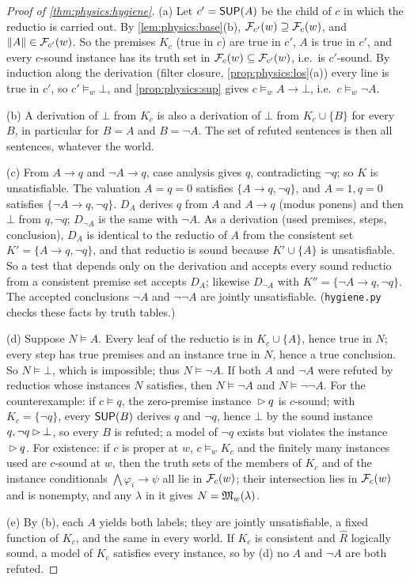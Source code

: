 \begin{proof}[Proof of \cref{thm:physics:hygiene}]
(a) Let $c'=\mathsf{SUP}(A)$ be the child of $c$ in which the reductio is carried out. By
\cref{lem:physics:base}(b), $\mathcal{F}_{c'}(w)\supseteq\mathcal{F}_c(w)$, and $\lVert A\rVert\in\mathcal{F}_{c'}(w)$. So the
premises $K_c$ (true in $c$) are true in $c'$, $A$ is true in $c'$, and every $c$-sound
instance has its truth set in $\mathcal{F}_c(w)\subseteq\mathcal{F}_{c'}(w)$, i.e.\ is $c'$-sound. By
induction along the derivation (filter closure, \cref{prop:physics:los}(a)) every line is
true in $c'$, so $c'\models_w\bot$, and \cref{prop:physics:sup} gives $c\models_w A\to\bot$,
i.e.\ $c\models_w\neg A$.

(b) A derivation of $\bot$ from $K_c$ is also a derivation of $\bot$ from $K_c\cup\{B\}$ for
every $B$, in particular for $B=A$ and $B=\neg A$. The set of refuted sentences is then all
sentences, whatever the world.

(c) From $A\to q$ and $\neg A\to q$, case analysis gives $q$, contradicting $\neg q$; so $K$
is unsatisfiable. The valuation $A=q=0$ satisfies $\{A\to q,\neg q\}$, and $A=1,q=0$
satisfies $\{\neg A\to q,\neg q\}$. $D_A$ derives $q$ from $A$ and $A\to q$ (modus ponens)
and then $\bot$ from $q,\neg q$; $D_{\neg A}$ is the same with $\neg A$. As a derivation
(used premises, steps, conclusion), $D_A$ is identical to the reductio of $A$ from the
consistent set $K'=\{A\to q,\neg q\}$, and that reductio is sound because $K'\cup\{A\}$ is
unsatisfiable. So a test that depends only on the derivation and accepts every sound
reductio from a consistent premise set accepts $D_A$; likewise $D_{\neg A}$ with
$K''=\{\neg A\to q,\neg q\}$. The accepted conclusions $\neg A$ and $\neg\neg A$ are jointly
unsatisfiable. (\texttt{hygiene.py} checks these facts by truth tables.)

(d) Suppose $N\models A$. Every leaf of the reductio is in $K_c\cup\{A\}$, hence true in $N$;
every step has true premises and an instance true in $N$, hence a true conclusion. So
$N\models\bot$, which is impossible; thus $N\models\neg A$. If both $A$ and $\neg A$ were
refuted by reductios whose instances $N$ satisfies, then $N\models\neg A$ and
$N\models\neg\neg A$. For the counterexample: if $c\models q$, the zero-premise instance
${}\rhd q$ is $c$-sound; with $K_c=\{\neg q\}$, every $\mathsf{SUP}(B)$ derives $q$ and $\neg q$,
hence $\bot$ by the sound instance $q,\neg q\rhd\bot$, so every $B$ is refuted; a model of
$\neg q$ exists but violates the instance ${}\rhd q$. For existence: if $c$ is proper at
$w$, $c\models_w K_c$ and the finitely many instances used are $c$-sound at $w$, then the
truth sets of the members of $K_c$ and of the instance conditionals
$\bigwedge\varphi_i\to\psi$ all lie in $\mathcal{F}_c(w)$; their intersection lies in $\mathcal{F}_c(w)$
and is nonempty, and any $\lambda$ in it gives $N=\mathfrak{M}_w(\lambda)$.

(e) By (b), each $A$ yields both labels; they are jointly unsatisfiable, a fixed function
of $K_c$, and the same in every world. If $K_c$ is consistent and $\hat R$ logically sound, a
model of $K_c$ satisfies every instance, so by (d) no $A$ and $\neg A$ are both refuted.
\end{proof}

